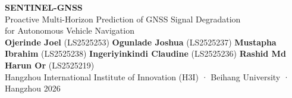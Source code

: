 \documentclass[20pt]{extarticle}   %
\begin{document}
\noindent
\begin{tcolorbox}[
  colback=buaaNavy, colframe=buaaNavy,
  boxrule=0pt, arc=8pt,
  left=16pt, right=16pt, top=10pt, bottom=10pt
]
  \begin{center}
    {\fontsize{52}{60}\bfseries\color{white} SENTINEL-GNSS}\\[6pt]
    {\fontsize{28}{34}\color{buaaSky}
     Proactive Multi-Horizon Prediction of GNSS Signal Degradation\\
     for Autonomous Vehicle Navigation}\\[8pt]
    {\large\color{white}
     \textbf{Ojerinde Joel} (LS2525253) \quad
     \textbf{Ogunlade Joshua} (LS2525237) \quad
     \textbf{Mustapha Ibrahim} (LS2525238) \quad
     \textbf{Ingeriyinkindi Claudine} (LS2525236) \quad
     \textbf{Rashid Md Harun Or} (LS2525219)}\\[4pt]
    {\normalsize\color{white!70!buaaSky}
     Hangzhou International Institute of Innovation (H3I) · Beihang University · Hangzhou 2026}
  \end{center}
\end{tcolorbox}

\vspace{0.6cm}
\end{document}
